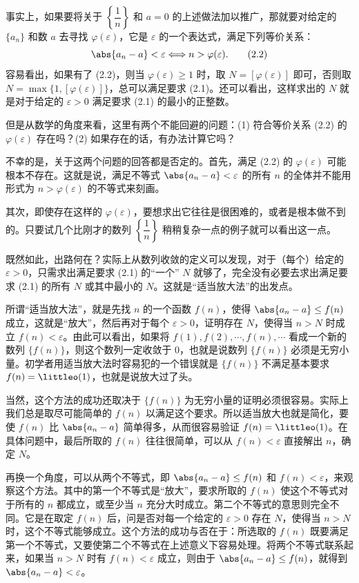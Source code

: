 事实上，如果要将关于 $\left\{\dfrac1n\right\}$ 和 $a=0$ 的上述做法加以推广，那就要对给定的 $\{a_n\}$ 和数 $a$ 去寻找 $\varphi(\varepsilon)$，它是 $\varepsilon$ 的一个表达式，满足下列等价关系：
\begin{equation}
  \abs{a_n-a}<\varepsilon\Longleftrightarrow n>\varphi(\varepsilon).
  \tag{2.2}
  \label{eq:2.2}
\end{equation}
容易看出，如果有了 (2.2)，则当 $\varphi(\varepsilon)\ge1$ 时，取 $N=[\varphi(\varepsilon)]$ 即可，否则取 $N=\max\{1,[\varphi(\varepsilon)]\}$，总可以满足要求 (2.1)。还可以看出，这样求出的 $N$ 就是对于给定的 $\varepsilon>0$ 满足要求 (2.1) 的最小的正整数。

但是从数学的角度来看，这里有两个不能回避的问题：(1) 符合等价关系 (2.2) 的 $\varphi(\varepsilon)$ 存在吗？(2) 如果存在的话，有办法计算它吗？

不幸的是，关于这两个问题的回答都是否定的。首先，满足 (2.2) 的 $\varphi(\varepsilon)$ 可能根本不存在。这就是说，满足不等式 $\abs{a_n-a}<\varepsilon$ 的所有 $n$ 的全体并不能用形式为 $n>\varphi(\varepsilon)$ 的不等式来刻画。

其次，即使存在这样的 $\varphi(\varepsilon)$，要想求出它往往是很困难的，或者是根本做不到的。只要试几个比刚才的数列 $\left\{\dfrac1n\right\}$ 稍稍复杂一点的例子就可以看出这一点。

既然如此，出路何在？实际上从数列收敛的定义可以发现，对于（每个）给定的 $\varepsilon>0$，只需求出满足要求 (2.1) 的“一个” $N$ 就够了，完全没有必要去求出满足要求 (2.1) 的所有 $N$ 或其中最小的 $N$。这就是“适当放大法”的出发点。

所谓“适当放大法”，就是先找 $n$ 的一个函数 $f(n)$，使得 $\abs{a_n-a}\le f(n)$ 成立，这就是“放大”，然后再对于每个 $\varepsilon>0$，证明存在 $N$，使得当 $n>N$ 时成立 $f(n)<\varepsilon$。由此可以看出，如果将 $f(1),f(2),\cdots,f(n),\cdots$ 看成一个新的数列 $\{f(n)\}$，则这个数列一定收敛于 $0$，也就是说数列 $\{f(n)\}$ 必须是无穷小量。初学者用适当放大法时容易犯的一个错误就是 $\{f(n)\}$ 不满足基本要求 $f(n)=\littleo(1)$，也就是说放大过了头。

当然，这个方法的成功还取决于 $\{f(n)\}$ 为无穷小量的证明必须很容易。实际上我们总是取尽可能简单的 $f(n)$ 以满足这个要求。所以适当放大也就是简化，要使 $f(n)$ 比 $\abs{a_n-a}$ 简单得多，从而很容易验证 $f(n)=\littleo(1)$。在具体问题中，最后所取的 $f(n)$ 往往很简单，可以从 $f(n)<\varepsilon$ 直接解出 $n$，确定 $N$。

再换一个角度，可以从两个不等式，即 $\abs{a_n-a}\le f(n)$ 和 $f(n)<\varepsilon$，来观察这个方法。其中的第一个不等式是“放大”，要求所取的 $f(n)$ 使这个不等式对于所有的 $n$ 都成立，或至少当 $n$ 充分大时成立。第二个不等式的意思则完全不同。它是在取定 $f(n)$ 后，问是否对每一个给定的 $\varepsilon>0$ 存在 $N$，使得当 $n>N$ 时，这个不等式能够成立。这个方法的成功与否在于：所选取的 $f(n)$ 既要满足第一个不等式，又要使第二个不等式在上述意义下容易处理。将两个不等式联系起来，如果当 $n>N$ 时有 $f(n)<\varepsilon$ 成立，则由于 $\abs{a_n-a}\le f(n)$，就得到 $\abs{a_n-a}<\varepsilon$。

